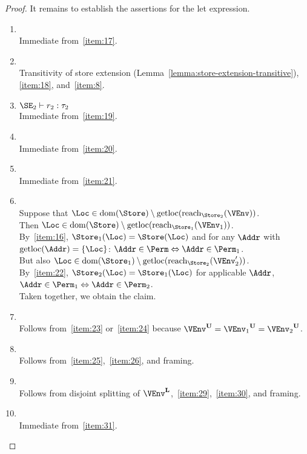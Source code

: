 \begin{proof}
  It remains to establish the assertions for the let expression.
  \begin{enumerate}[({R}-1)]
  \item {}
    \\ Immediate from~\ref{item:17}.
  \item {}
    \\ Transitivity of store extension
    (Lemma~\ref{lemma:store-extension-transitive}), \ref{item:18},
    and~\ref{item:8}.
  \item  $\SE_2 \vdash r_2 : \tau_2$
    \\ Immediate from~\ref{item:19}.
  \item {}
    \\ Immediate from~\ref{item:20}.
  \item {}
    \\ Immediate from~\ref{item:21}.
  \item {}
    ~\\ Suppose that $\Loc \in \Dom\Store \setminus
    \Rawloc{\Reach{\Store_2}{\VEnv}}$.
    \\ Then $\Loc \in \Dom\Store \setminus
    \Rawloc{\Reach{\Store_1}{\VEnv_1}}$.
    \\ By~\ref{item:16}, $\Store_1 (\Loc) = \Store (\Loc)$ and for any
    $\Addr$ with $\Rawloc\Addr = \{\Loc\}$: $\Addr \in \Perm
    \Leftrightarrow \Addr \in \Perm_1$.
    \\ But also $\Loc \in \Dom{\Store_1} \setminus
    \Rawloc{\Reach{\Store_2}{\VEnv_2'}}$.
    \\ By~\ref{item:22}, $\Store_2 (\Loc) = \Store_1 (\Loc)$ for
    applicable $\Addr$, $\Addr \in \Perm_1
    \Leftrightarrow \Addr \in \Perm_2$.
    \\ Taken together, we obtain the claim.
  \item {}
    \\ Follows from~\ref{item:23} or~\ref{item:24} because
    $\ImmutableBorrows\VEnv = \ImmutableBorrows{\VEnv_1} =
    \ImmutableBorrows{\VEnv_2}$.
  \item {}
    \\ Follows from~\ref{item:25},~\ref{item:26}, and framing.
  \item {}
    \\ Follows from disjoint splitting of
    $\Active\VEnv$,~\ref{item:29},~\ref{item:30}, and framing.
  \item {}
    \\ Immediate from~\ref{item:31}.
  \end{enumerate}


\end{proof}
